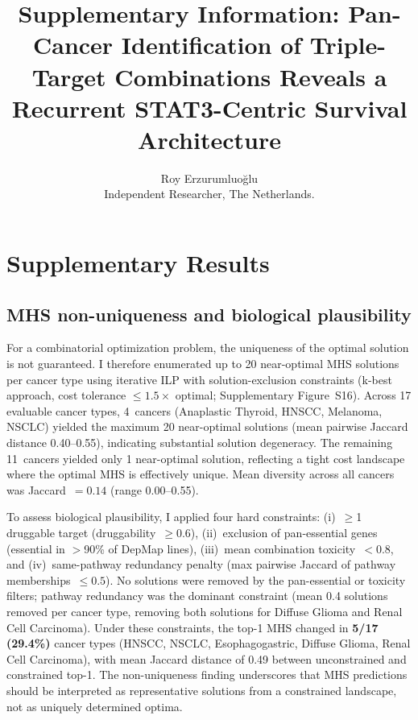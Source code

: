 \documentclass[11pt]{article}
\begin{document}
\title{Supplementary Information: Pan-Cancer Identification of Triple-Target Combinations Reveals a Recurrent STAT3-Centric Survival Architecture}
\author{Roy Erzurumluoğlu\\
  Independent Researcher, The Netherlands.}
\maketitle

\tableofcontents
\newpage


\section{Supplementary Results}

\subsection{MHS non-uniqueness and biological plausibility}
\label{sec:mhs_nonunique}
For a combinatorial optimization problem, the uniqueness of the optimal solution is not guaranteed. I therefore enumerated up to 20 near-optimal MHS solutions per cancer type using iterative ILP with solution-exclusion constraints (k-best approach, cost tolerance $\leq 1.5\times$ optimal; Supplementary Figure~S16). Across 17 evaluable cancer types, 4~cancers (Anaplastic Thyroid, HNSCC, Melanoma, NSCLC) yielded the maximum 20 near-optimal solutions (mean pairwise Jaccard distance 0.40--0.55), indicating substantial solution degeneracy. The remaining 11~cancers yielded only 1 near-optimal solution, reflecting a tight cost landscape where the optimal MHS is effectively unique. Mean diversity across all cancers was Jaccard~$= 0.14$ (range 0.00--0.55).

To assess biological plausibility, I applied four hard constraints: (i)~$\geq$1 druggable target (druggability~$\geq 0.6$), (ii)~exclusion of pan-essential genes (essential in $>$90\% of DepMap lines), (iii)~mean combination toxicity~$< 0.8$, and (iv)~same-pathway redundancy penalty (max pairwise Jaccard of pathway memberships~$\leq 0.5$). No solutions were removed by the pan-essential or toxicity filters; pathway redundancy was the dominant constraint (mean 0.4 solutions removed per cancer type, removing both solutions for Diffuse Glioma and Renal Cell Carcinoma). Under these constraints, the top-1 MHS changed in \textbf{5/17 (29.4\%)} cancer types (HNSCC, NSCLC, Esophagogastric, Diffuse Glioma, Renal Cell Carcinoma), with mean Jaccard distance of 0.49 between unconstrained and constrained top-1. The non-uniqueness finding underscores that MHS predictions should be interpreted as representative solutions from a constrained landscape, not as uniquely determined optima.
\end{document}
